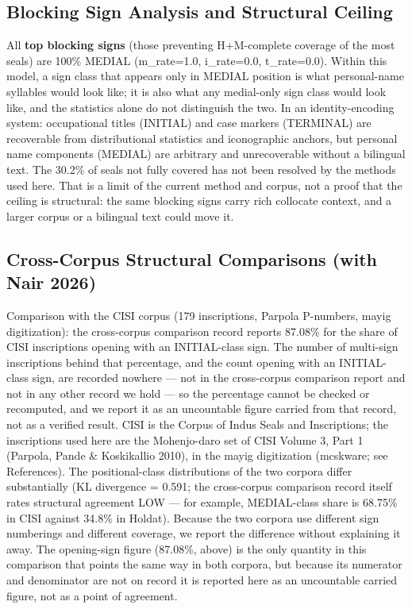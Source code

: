 \documentclass[11pt]{article}
\begin{document}
\subsection{Blocking Sign Analysis and Structural Ceiling
}\label{blocking-sign-analysis-and-structural-ceiling-phase-144}

All \textbf{top blocking signs} (those preventing H+M-complete coverage of the most seals) are 100\% MEDIAL (m\_rate=1.0, i\_rate=0.0,
t\_rate=0.0). Within this model, a sign class that appears only in MEDIAL position is what personal-name syllables would look like; it is also what any medial-only sign class would look like, and the statistics alone do not distinguish the two. In an identity-encoding system: occupational titles (INITIAL) and case
markers (TERMINAL) are recoverable from distributional statistics and
iconographic anchors, but personal name components (MEDIAL) are
arbitrary and unrecoverable without a bilingual text. The 30.2\% of seals not fully covered has not been resolved by the methods used here. That is a limit of the current method and corpus, not a proof that the ceiling is structural: the same blocking signs carry rich collocate context, and a larger corpus or a bilingual text could move it.

\subsection{Cross-Corpus Structural Comparisons (with Nair 2026)}\label{cross-corpus-structural-validation-phase-145-nair-2026}

Comparison with the CISI corpus (179 inscriptions, Parpola P-numbers, mayig digitization): the cross-corpus comparison record reports 87.08\% for the share of CISI inscriptions opening with an INITIAL-class sign. The number of multi-sign inscriptions behind that percentage, and the count opening with an INITIAL-class sign, are recorded nowhere --- not in the cross-corpus comparison report and not in any other record we hold --- so the percentage cannot be checked or recomputed, and we report it as an uncountable figure carried from that record, not as a verified result. CISI is the Corpus of Indus Seals and Inscriptions; the inscriptions used here are the Mohenjo-daro set of CISI Volume 3, Part 1 (Parpola, Pande \& Koskikallio 2010), in the mayig digitization (mcskware; see References). The positional-class distributions of the two corpora differ substantially (KL divergence = 0.591; the cross-corpus comparison record itself rates structural agreement LOW --- for example, MEDIAL-class share is 68.75\% in CISI against 34.8\% in Holdat). Because the two corpora use different sign numberings and different coverage, we report the difference without explaining it away. The opening-sign figure (87.08\%, above) is the only quantity in this comparison that points the same way in both corpora, but because its numerator and denominator are not on record it is reported here as an uncountable carried figure, not as a point of agreement.
\end{document}
